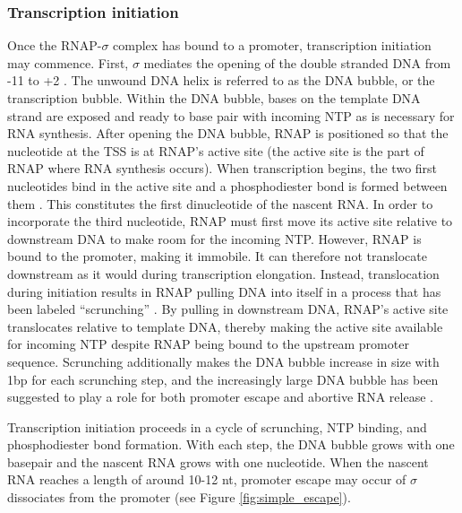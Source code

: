 \subsubsection{Transcription initiation}
Once the RNAP-$\sigma$ complex has bound to a promoter, transcription
initiation may commence. First, $\sigma$ mediates the opening of the double
stranded DNA from -11 to +2 \cite{borukhov_rna_2008}. The unwound DNA helix is
referred to as the DNA bubble, or the transcription bubble. Within the DNA
bubble, bases on the template DNA strand are exposed and ready to base pair
with incoming NTP as is necessary for RNA synthesis. After opening the DNA
bubble, RNAP is positioned so that the nucleotide at the TSS is at RNAP's
active site (the active site is the part of RNAP where RNA synthesis occurs).
When transcription begins, the two first nucleotides bind in the active site
and a phosphodiester bond is formed between them \cite{mcclure_steady_1978}.
This constitutes the first dinucleotide of the nascent RNA. In order to
incorporate the third nucleotide, RNAP must first move its active site relative
to downstream DNA to make room for the incoming NTP. However, RNAP is bound to
the promoter, making it immobile. It can therefore not translocate downstream
as it would during transcription elongation. Instead, translocation during
initiation results in RNAP pulling DNA into itself in a process that has been
labeled ``scrunching'' \cite{kapanidis_initial_2006, revyakin_abortive_2006}.
By pulling in downstream DNA, RNAP's active site translocates relative to
template DNA, thereby making the active site available for incoming NTP despite
RNAP being bound to the upstream promoter sequence. Scrunching additionally
makes the DNA bubble increase in size with 1bp for each scrunching step, and
the increasingly large DNA bubble has been suggested to play a role for both
promoter escape and abortive RNA release \cite{lilian_m_promoter_2002,
kapanidis_initial_2006}.

Transcription initiation proceeds in a cycle of scrunching, NTP binding, and
phosphodiester bond formation. With each step, the DNA bubble grows with one
basepair and the nascent RNA grows with one nucleotide. When the nascent RNA
reaches a length of around 10-12 nt, promoter escape may occur of $\sigma$
dissociates from the promoter \cite{lilian_m_promoter_2002} (see
Figure \ref{fig:simple_escape}).


